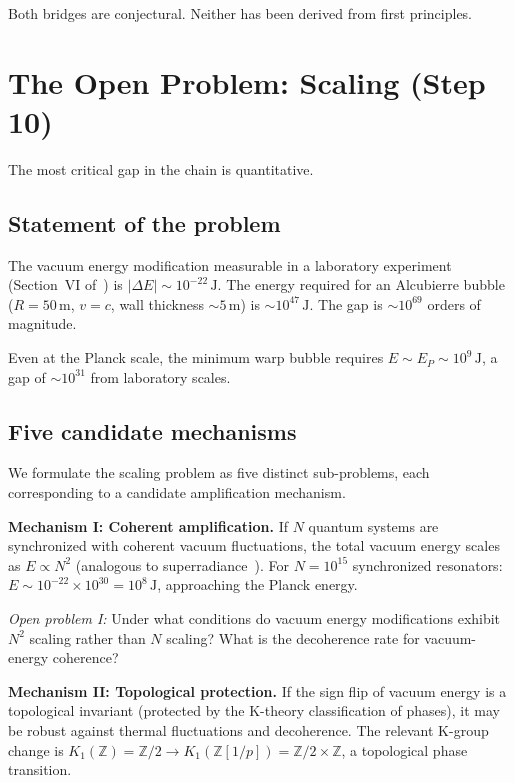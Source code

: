 \documentclass[aps,prd,twocolumn,superscriptaddress,nofootinbib]{revtex4-2}
\newcommand{\Zp}{\mathbb{Z}[1/p]}
\begin{document}
Both bridges are conjectural. Neither has been derived from
first principles.

\section{The Open Problem: Scaling (Step 10)}
\label{sec:scaling}

The most critical gap in the chain is quantitative.

\subsection{Statement of the problem}

The vacuum energy modification measurable in a laboratory
experiment (Section~VI of~\cite{paper_A}) is
$|\Delta E| \sim 10^{-22}\,\mathrm{J}$.
The energy required for an Alcubierre bubble
($R = 50\,\mathrm{m}$, $v = c$, wall thickness $\sim 5\,\mathrm{m}$)
is $\sim 10^{47}\,\mathrm{J}$.
The gap is $\sim 10^{69}$ orders of magnitude.

Even at the Planck scale, the minimum warp bubble
requires $E \sim E_P \sim 10^9\,\mathrm{J}$, a gap
of $\sim 10^{31}$ from laboratory scales.

\subsection{Five candidate mechanisms}

We formulate the scaling problem as five distinct sub-problems,
each corresponding to a candidate amplification mechanism.

\textbf{Mechanism I: Coherent amplification.}
If $N$ quantum systems are synchronized with coherent
vacuum fluctuations, the total vacuum energy scales as
$E \propto N^2$ (analogous to superradiance~\cite{Dicke1954}).
For $N = 10^{15}$ synchronized resonators:
$E \sim 10^{-22} \times 10^{30} = 10^{8}\,\mathrm{J}$,
approaching the Planck energy.

\textit{Open problem I:} Under what conditions do vacuum energy
modifications exhibit $N^2$ scaling rather than $N$ scaling?
What is the decoherence rate for vacuum-energy coherence?

\textbf{Mechanism II: Topological protection.}
If the sign flip of vacuum energy is a topological invariant
(protected by the K-theory classification of phases), it may
be robust against thermal fluctuations and decoherence.
The relevant K-group change is
$K_1(\mathbb{Z}) = \mathbb{Z}/2 \to K_1(\Zp) = \mathbb{Z}/2 \times \mathbb{Z}$,
a topological phase transition.
\end{document}
